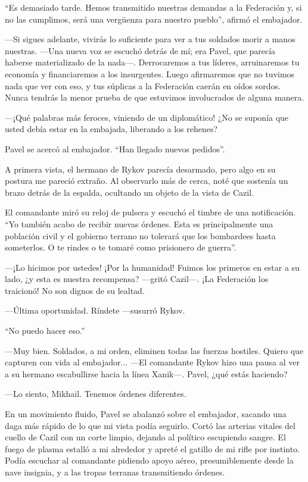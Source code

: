 ``Es demasiado tarde. Hemos transmitido nuestras demandas a la Federación y, si no las cumplimos, será una vergüenza para nuestro pueblo'', afirmó el embajador.

—Si sigues adelante, vivirás lo suficiente para ver a tus soldados morir a manos nuestras. —Una nueva voz se escuchó detrás de mí; era Pavel, que parecía haberse materializado de la nada—. Derrocaremos a tus líderes, arruinaremos tu economía y financiaremos a los insurgentes. Luego afirmaremos que no tuvimos nada que ver con eso, y tus súplicas a la Federación caerán en oídos sordos. Nunca tendrás la menor prueba de que estuvimos involucrados de alguna manera.

—¡Qué palabras más feroces, viniendo de un diplomático! ¿No se suponía que usted debía estar en la embajada, liberando a los rehenes?

Pavel se acercó al embajador. ``Han llegado nuevos pedidos''.

A primera vista, el hermano de Rykov parecía desarmado, pero algo en su postura me pareció extraño. Al observarlo más de cerca, noté que sostenía un brazo detrás de la espalda, ocultando un objeto de la vista de Cazil.

El comandante miró su reloj de pulsera y escuchó el timbre de una notificación. ``Yo también acabo de recibir nuevas órdenes. Esta es principalmente una población civil y el gobierno terrano no tolerará que los bombardees hasta someterlos. O te rindes o te tomaré como prisionero de guerra''.

—¡Lo hicimos por ustedes! ¡Por la humanidad! Fuimos los primeros en estar a su lado, ¿y esta es nuestra recompensa? —gritó Cazil—. ¡La Federación los traicionó! No son dignos de su lealtad.

—Última oportunidad. Ríndete —susurró Rykov.

``No puedo hacer eso.''

—Muy bien. Soldados, a mi orden, eliminen todas las fuerzas hostiles. Quiero que capturen con vida al embajador... —El comandante Rykov hizo una pausa al ver a su hermano escabullirse hacia la línea Xanik—. Pavel, ¿qué estás haciendo?

—Lo siento, Mikhail. Tenemos órdenes diferentes.

En un movimiento fluido, Pavel se abalanzó sobre el embajador, sacando una daga más rápido de lo que mi vista podía seguirlo. Cortó las arterias vitales del cuello de Cazil con un corte limpio, dejando al político escupiendo sangre. El fuego de plasma estalló a mi alrededor y apreté el gatillo de mi rifle por instinto. Podía escuchar al comandante pidiendo apoyo aéreo, presumiblemente desde la nave insignia, y a las tropas terranas transmitiendo órdenes.


